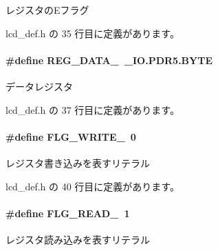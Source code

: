 レジスタの\+Eフラグ 



 lcd\+\_\+def.\+h の 35 行目に定義があります。

\paragraph[{R\+E\+G\+\_\+\+D\+A\+T\+A\+\_\+}]{\setlength{\rightskip}{0pt plus 5cm}\#define R\+E\+G\+\_\+\+D\+A\+T\+A\+\_\+~\+\_\+\+I\+O.\+P\+D\+R5.\+B\+Y\+T\+E}\label{lcd__def_8h_a777575796174476e6a20bed751e7b143_a777575796174476e6a20bed751e7b143}


データレジスタ 



 lcd\+\_\+def.\+h の 37 行目に定義があります。

\paragraph[{F\+L\+G\+\_\+\+W\+R\+I\+T\+E\+\_\+}]{\setlength{\rightskip}{0pt plus 5cm}\#define F\+L\+G\+\_\+\+W\+R\+I\+T\+E\+\_\+~0}\label{lcd__def_8h_afad612e1d187e74acde49431c5f7e8d1_afad612e1d187e74acde49431c5f7e8d1}


レジスタ書き込みを表すリテラル 



 lcd\+\_\+def.\+h の 40 行目に定義があります。

\paragraph[{F\+L\+G\+\_\+\+R\+E\+A\+D\+\_\+}]{\setlength{\rightskip}{0pt plus 5cm}\#define F\+L\+G\+\_\+\+R\+E\+A\+D\+\_\+~1}\label{lcd__def_8h_a36018355603fcc742f68a89ffadbebff_a36018355603fcc742f68a89ffadbebff}


レジスタ読み込みを表すリテラル 



